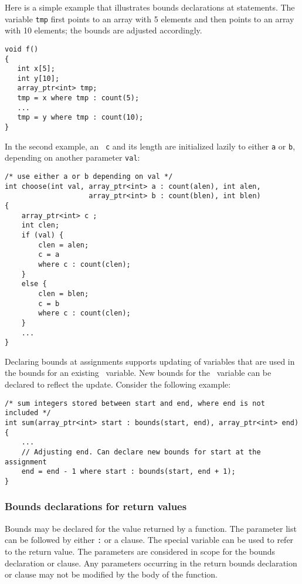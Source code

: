 Here is a simple example that illustrates bounds declarations at
statements. The variable \texttt{tmp} first points to an array with 5
elements and then points to an array with 10 elements; the bounds are
adjusted accordingly.

\begin{verbatim}
void f() 
{
   int x[5];
   int y[10];
   array_ptr<int> tmp;
   tmp = x where tmp : count(5);
   ...
   tmp = y where tmp : count(10);
}
\end{verbatim}

In the second example, an \arrayptr\ \texttt{c} and its length are initialized
lazily to either \texttt{a} or \texttt{b}, depending on another parameter \texttt{val}:

\begin{verbatim}
/* use either a or b depending on val */
int choose(int val, array_ptr<int> a : count(alen), int alen,
                    array_ptr<int> b : count(blen), int blen) 
{
    array_ptr<int> c ;
    int clen;
    if (val) {
        clen = alen;
        c = a
        where c : count(clen);
    }
    else {
        clen = blen;
        c = b
        where c : count(clen);
    }    
    ...
}
\end{verbatim}

Declaring bounds at assignments supports updating of variables that are
used in the bounds for an existing \arrayptr\ variable. New
bounds for the \arrayptr\ variable can be declared to reflect
the update. Consider the following example:

\begin{verbatim}
/* sum integers stored between start and end, where end is not included */
int sum(array_ptr<int> start : bounds(start, end), array_ptr<int> end)
{ 
    ...
    // Adjusting end. Can declare new bounds for start at the assignment
    end = end - 1 where start : bounds(start, end + 1);
}
\end{verbatim}

\subsubsection{Bounds declarations for return values}

Bounds may be declared for the value returned by a function. The
parameter list can be followed by either \texttt{:}  or
a  clause. The special variable  can
be used to refer to the return value. The parameters are considered in
scope for the bounds declaration or  clause. Any parameters
occurring in the return bounds declaration or  clause may
not be modified by the body of the function.

